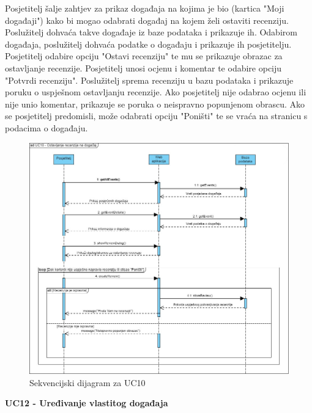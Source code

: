 				\noindent Posjetitelj šalje zahtjev za prikaz događaja na kojima je bio 
				(kartica "Moji događaji") kako bi mogao odabrati događaj na kojem
				želi ostaviti recenziju. Poslužitelj dohvaća takve događaje iz baze podataka
				i prikazuje ih. Odabirom događaja, poslužitelj dohvaća podatke o događaju
				i prikazuje ih posjetitelju. Posjetitelj odabire opciju "Ostavi recenziju"
				te mu se prikazuje obrazac za ostavljanje recenzije. Posjetitelj unosi
				ocjenu i komentar te odabire opciju "Potvrdi recenziju". Poslužitelj
				sprema recenziju u bazu podataka i prikazuje poruku o uspješnom ostavljanju
				recenzije. Ako posjetitelj nije odabrao ocjenu ili nije unio komentar,
				prikazuje se poruka o neispravno popunjenom obrascu. Ako se posjetitelj
				predomisli, može odabrati opciju "Poništi" te se vraća na stranicu s
				podacima o događaju.
		\newpage
				\begin{figure}[htbp]
					\centering
					\includegraphics[width=1\textwidth]{dijagrami/seq_diagram_review.jpg}
					\caption{Sekvencijski dijagram za UC10}
				\label{fig:my_image}
				\end{figure}
		\newpage

		\noindent \textbf{UC12 - Uređivanje vlastitog događaja}

